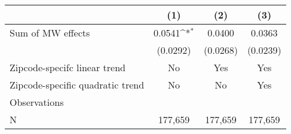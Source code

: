 {
\def\sym#1{\ifmmode^{#1}\else\(^{#1}\)\fi}
\begin{tabular}{l*{3}{c}}
\hline\hline
          &\multicolumn{1}{c}{(1)}         &\multicolumn{1}{c}{(2)}         &\multicolumn{1}{c}{(3)}         \\
\hline
Sum of MW effects&   0.0541\sym{*}  &   0.0400         &   0.0363         \\
          & (0.0292)         & (0.0268)         & (0.0239)         \\
\hline
Zipcode-specifc linear trend&       No         &      Yes         &      Yes         \\
Zipcode-specific quadratic trend&       No         &       No         &      Yes         \\
Observations&                  &                  &                  \\
N         &  177,659         &  177,659         &  177,659         \\
\hline\hline
\end{tabular}
}

